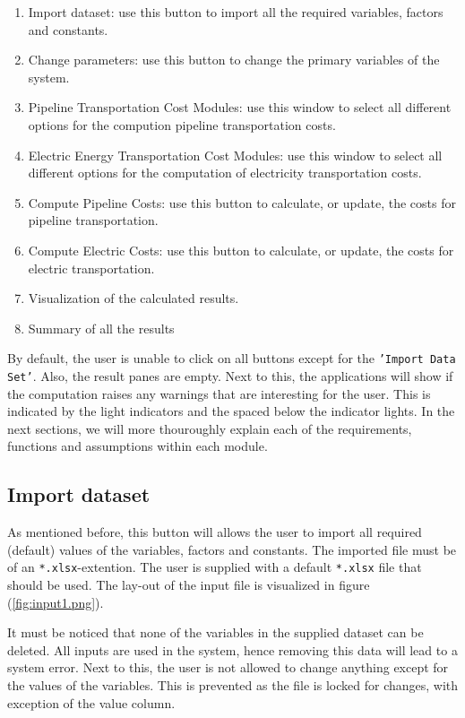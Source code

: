 \documentclass{article}
\begin{document}
\begin{enumerate}
	\item Import dataset: use this button to import all the required variables, factors and constants.  
	\item Change parameters: use this button to change the primary variables of the system. 
	\item Pipeline Transportation Cost Modules: use this window to select all different options for the compution pipeline transportation costs.
	\item Electric Energy Transportation Cost Modules: use this window to select all different options for the computation of electricity transportation costs.
	\item Compute Pipeline Costs: use this button to calculate, or update, the costs for pipeline transportation.
	\item Compute Electric Costs: use this button to calculate, or update, the costs for electric transportation.
	\item Visualization of the calculated results.
	\item Summary of all the results
\end{enumerate}

By default, the user is unable to click on all buttons except for the \texttt{'Import Data Set'}. Also, the result panes are empty. Next to this, the applications will show if the computation raises any warnings that are interesting for the user. This is indicated by the light indicators and the spaced below the indicator lights. In the next sections, we will more thouroughly explain each of the requirements, functions and assumptions within each module. 

\subsection{Import dataset}
As mentioned before, this button will allows the user to import all required (default) values of the variables, factors and constants. The imported file must be of an \texttt{*.xlsx}-extention. The user is supplied with a default \texttt{*.xlsx} file that should be used. The lay-out of the input file is visualized in figure (\ref{fig:input1.png}).
\begin{warn}
	It must be noticed that none of the variables in the supplied dataset can be deleted. All inputs are used in the system, hence removing this data will lead to a system error. Next to this, the user is not allowed to change anything except for the values of the variables. This is prevented as the file is locked for changes, with exception of the value column.
\end{warn}
 
\end{document}
